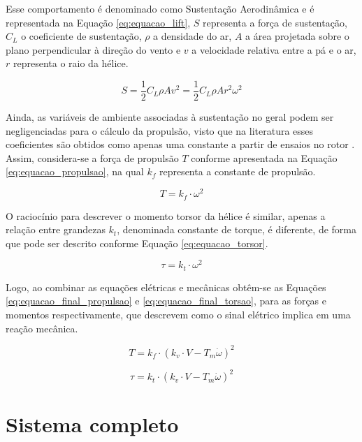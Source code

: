 \documentclass[main.tex]{subfiles}
\begin{document}
Esse comportamento é denominado como Sustentação Aerodinâmica \cite{fundamentals_aerodynamics} e é representada na Equação \ref{eq:equacao_lift}, $S$ representa a força de sustentação, $C_L$ o coeficiente de sustentação, $\rho$ a densidade do ar, $A$ a área projetada sobre o plano perpendicular à direção do vento e $v$ a velocidade relativa entre a pá e o ar, $r$ representa o raio da hélice.

\begin{equation}\label{eq:equacao_lift}
	S = \frac{1}{2}C_L\rho A v^2 = \frac{1}{2}C_L\rho A r^2 \omega^2
\end{equation}

Ainda, as variáveis de ambiente associadas à sustentação no geral podem ser negligenciadas para o cálculo da propulsão, visto que na literatura esses coeficientes são obtidos como apenas uma constante a partir de ensaios no rotor \cite{muzar2016experimental}. Assim, considera-se a força de propulsão $T$ conforme apresentada na Equação \ref{eq:equacao_propulsao}, na qual $k_f$ representa a constante de propulsão.

\begin{equation}\label{eq:equacao_propulsao}
	T = k_f \cdot \omega^2
\end{equation}

O raciocínio para descrever o momento torsor da hélice é similar, apenas a relação entre grandezas $k_t$, denominada constante de torque, é diferente, de forma que pode ser descrito conforme Equação \ref{eq:equacao_torsor}.

\begin{equation}\label{eq:equacao_torsor}
	\tau = k_t \cdot \omega^2
\end{equation}

Logo, ao combinar as equações elétricas e mecânicas obtêm-se as Equações \ref{eq:equacao_final_propulsao} e \ref{eq:equacao_final_torsao}, para as forças e momentos respectivamente, que descrevem como o sinal elétrico implica em uma reação mecânica.

\begin{equation}\label{eq:equacao_final_propulsao}
	T = k_f \cdot (k_v \cdot V - T_m\dot{\omega})^2
\end{equation}

\begin{equation}\label{eq:equacao_final_torsao}
	\tau = k_t \cdot (k_v \cdot V - T_m\dot{\omega})^2
\end{equation}

\section{Sistema completo}
\end{document}
